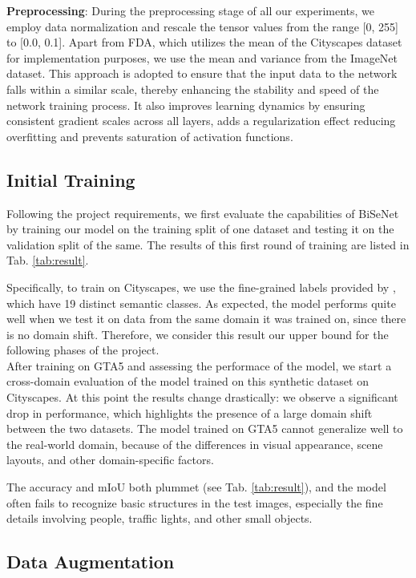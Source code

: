 \documentclass[10pt,twocolumn,letterpaper]{article}
\begin{document}
\textbf{Preprocessing}: During the preprocessing stage of all our experiments, we employ data normalization and rescale the tensor values from the range [0, 255] to [0.0, 0.1]. Apart from FDA, which utilizes the mean of the Cityscapes dataset for implementation purposes, we use the mean and variance from the ImageNet dataset. This approach is adopted to ensure that the input data to the network falls within a similar scale, thereby enhancing the stability and speed of the network training process. It also improves learning dynamics by ensuring consistent gradient scales across all layers, adds a regularization effect reducing overfitting and prevents saturation of activation functions.

\subsection{Initial Training}

Following the project requirements, we first evaluate the capabilities of BiSeNet by training our model on the training split of one dataset and testing it on the validation split of the same. The results of this first round of training are listed in Tab. \ref{tab:result}.

Specifically, to train on Cityscapes, we use the fine-grained labels provided by \cite{City}, which have 19 distinct semantic classes. As expected, the model performs quite well when we test it on data from the same domain it was trained on, since there is no domain shift. Therefore, we consider this result our upper bound for the following phases of the project.\\

After training on GTA5 and assessing the performace of the model, we start a cross-domain evaluation of the model trained on this synthetic dataset on Cityscapes. At this point the results change drastically: we observe a significant drop in performance, which highlights the presence of a large domain shift between the two datasets. The model trained on GTA5 cannot generalize well to the real-world domain, because of the differences in visual appearance, scene layouts, and other domain-specific factors.

The accuracy and mIoU both plummet (see Tab. \ref{tab:result}), and the model often fails to recognize basic structures in the test images, especially the fine details involving people, traffic lights, and other small objects.

\subsection{Data Augmentation}
\end{document}
